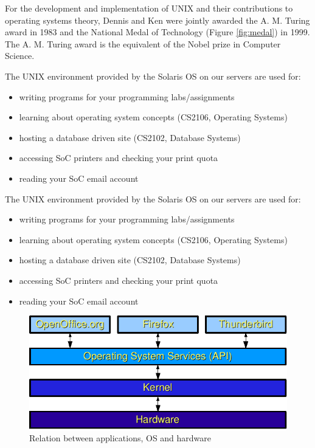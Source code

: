 For the development and implementation of UNIX and their contributions to
operating systems theory, Dennis and Ken were jointly awarded the A. M. Turing
award in 1983 and the National Medal of Technology (Figure \ref{fig:medal}) in
1999. The A. M. Turing award is the equivalent of the Nobel prize in Computer
Science.  
\begin{frame}
The UNIX environment provided by the Solaris OS on our servers are used for:
\begin{itemize}
\item writing programs for your programming labs/assignments
\item learning about operating system concepts (CS2106, Operating Systems)
\item hosting a database driven site (CS2102, Database Systems)
\item accessing SoC printers and checking your print quota
\item reading your SoC email account
\end{itemize}
\end{frame}

\begin{frame}
The UNIX environment provided by the Solaris OS on our servers are used for:
\begin{itemize}
\item writing programs for your programming labs/assignments
\item learning about operating system concepts (CS2106, Operating Systems)
\item hosting a database driven site (CS2102, Database Systems)
\item accessing SoC printers and checking your print quota
\item reading your SoC email account
\end{itemize}
\end{frame}

\begin{frame}
\begin{figure}
\begin{center}
\includegraphics[width=0.7\linewidth]{os-layers}
\end{center}
\caption{Relation between applications, OS and hardware}
\label{fig:os}
\end{figure}
\end{frame}

